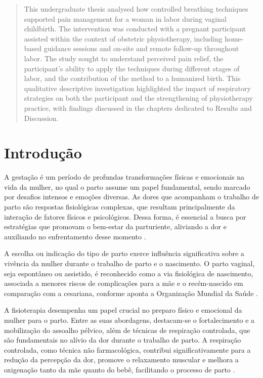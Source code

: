 \documentclass[openright]{tex/estilos/normas-utf-tex}
\begin{document}
\begin{abstract}
This undergraduate thesis analysed how controlled breathing techniques supported pain management for a woman in labor during vaginal childbirth. The intervention was conducted with a pregnant participant assisted within the context of obstetric physiotherapy, including home-based guidance sessions and on-site and remote follow-up throughout labor. The study sought to understand perceived pain relief, the participant's ability to apply the techniques during different stages of labor, and the contribution of the method to a humanized birth. This qualitative descriptive investigation highlighted the impact of respiratory strategies on both the participant and the strengthening of physiotherapy practice, with findings discussed in the chapters dedicated to Results and Discussion.
\end{abstract}

\listadefiguras
\listadetabelas

\sumario

\clearpage
\hypersetup{pageanchor=true}

\chapter{Introdução}
\label{chap:introducao}

A gestação é um período de profundas transformações físicas e emocionais na vida da mulher, no qual o parto assume um papel fundamental, sendo marcado por desafios intensos e emoções diversas. As dores que acompanham o trabalho de parto são respostas fisiológicas complexas, que resultam principalmente da interação de fatores físicos e psicológicos. Dessa forma, é essencial a busca por estratégias que promovam o bem-estar da parturiente, aliviando a dor e auxiliando no enfrentamento desse momento \cite[p.~54]{almeida2005}.

A escolha ou indicação do tipo de parto exerce influência significativa sobre a vivência da mulher durante o trabalho de parto e o nascimento. O parto vaginal, seja espontâneo ou assistido, é reconhecido como a via fisiológica de nascimento, associada a menores riscos de complicações para a mãe e o recém-nascido em comparação com a cesariana, conforme aponta a Organização Mundial da Saúde \cite{oms2018}.

A fisioterapia desempenha um papel crucial no preparo físico e emocional da mulher para o parto. Entre as suas abordagens, destacam-se o fortalecimento e a mobilização do assoalho pélvico, além de técnicas de respiração controlada, que são fundamentais no alívio da dor durante o trabalho de parto. A respiração controlada, como técnica não farmacológica, contribui significativamente para a redução da percepção da dor, promove o relaxamento muscular e melhora a oxigenação tanto da mãe quanto do bebê, facilitando o processo de parto \cite{cortes2015}.
\end{document}
